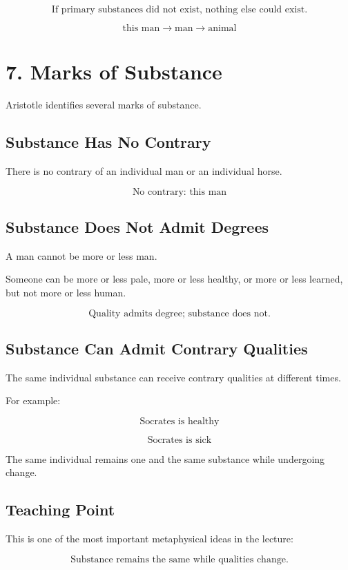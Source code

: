 \documentclass[12pt]{article}
\begin{document}
\[
\boxed{
\text{If primary substances did not exist, nothing else could exist.}
}
\]

\[
\text{this man} \rightarrow \text{man} \rightarrow \text{animal}
\]

\section*{7. Marks of Substance}

Aristotle identifies several marks of substance.

\subsection*{Substance Has No Contrary}

There is no contrary of an individual man or an individual horse.

\[
\text{No contrary: this man}
\]

\subsection*{Substance Does Not Admit Degrees}

A man cannot be more or less man.

Someone can be more or less pale, more or less healthy, or more or less
learned, but not more or less human.

\[
\text{Quality admits degree; substance does not.}
\]

\subsection*{Substance Can Admit Contrary Qualities}

The same individual substance can receive contrary qualities at different
times.

For example:

\[
\text{Socrates is healthy}
\]

\[
\text{Socrates is sick}
\]

The same individual remains one and the same substance while undergoing change.

\subsection*{Teaching Point}

This is one of the most important metaphysical ideas in the lecture:

\[
\boxed{
\text{Substance remains the same while qualities change.}
}
\]
\end{document}
